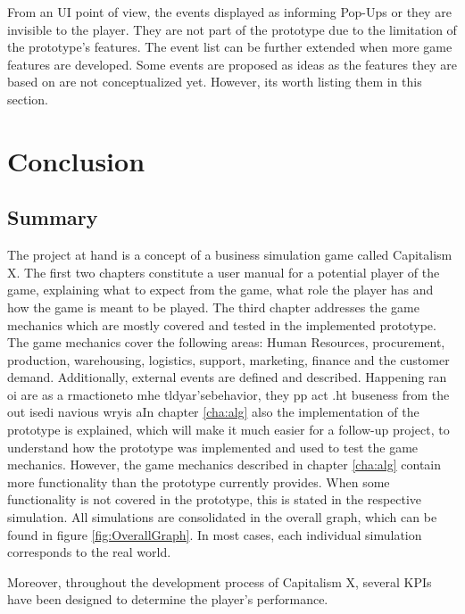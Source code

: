 \documentclass[11pt,titlepage,oneside,openany]{book}
\begin{document}
From an UI point of view, the events displayed as informing Pop-Ups or they are invisible to the player. They are not part of the prototype due to the limitation of the prototype's features. The event list can be further extended when more game features are developed. Some events are proposed as ideas as the features they are based on are not conceptualized yet. However, its worth listing them in this section. 



\chapter{Conclusion}
\label{sec:conclusion}

\section{Summary}
\label{sec:summary}
The project at hand is a concept of a business simulation game called Capitalism X. The first two chapters constitute a user manual for a potential player of the game, explaining what to expect from the  game, what role the player has and how the game is meant to be played. The third chapter addresses the game mechanics which are mostly covered and tested in the implemented prototype. The game mechanics cover the following areas: Human Resources, procurement, production, warehousing, logistics, support, marketing, finance and the customer demand. Additionally, external events are defined and described. Happening ran oi are as a rmactioneto mhe tldyar'sebehavior, they pp act .ht buseness from the out isedi  navious wryis aIn chapter \ref{cha:alg} also the implementation of the prototype is explained, which will make it much easier for a follow-up project, to understand how the prototype was implemented and used to test the game mechanics. 
However, the game mechanics described in chapter \ref{cha:alg} contain more functionality than the prototype currently provides. When some functionality is not covered in the prototype, this is stated in the respective simulation. All simulations are consolidated in the overall graph, which can be found in figure \ref{fig:OverallGraph}. In most cases, each individual simulation corresponds to the real world.

Moreover, throughout the development process of Capitalism X, several KPIs have been designed to determine the player's performance.

\end{document}
